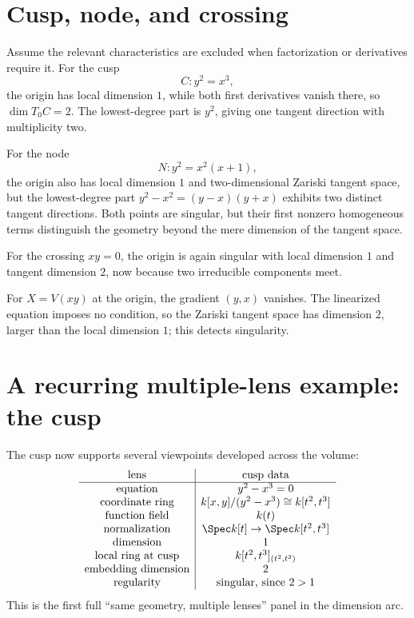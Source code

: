 \section{Cusp, node, and crossing}\label{sec:vi32-cusp-node}
Assume the relevant characteristics are excluded when factorization or derivatives require it.
For the cusp
\[
 C: y^2=x^3,
\]
the origin has local dimension $1$, while both first derivatives vanish there, so $\dim T_0C=2$.  The lowest-degree
part is $y^2$, giving one tangent direction with multiplicity two.

For the node
\[
 N:y^2=x^2(x+1),
\]
the origin also has local dimension $1$ and two-dimensional Zariski tangent space, but the lowest-degree part
$y^2-x^2=(y-x)(y+x)$ exhibits two distinct tangent directions.  Both points are singular, but their first nonzero
homogeneous terms distinguish the geometry beyond the mere dimension of the tangent space.

For the crossing $xy=0$, the origin is again singular with local dimension $1$ and tangent dimension $2$, now because
two irreducible components meet.


\begin{example}\label{ex:vi32-expand-03}
For $X=V(xy)$ at the origin, the gradient $(y,x)$ vanishes.  The linearized equation imposes no condition, so the Zariski tangent space has dimension $2$, larger than the local dimension $1$; this detects singularity.
\end{example}
\section{A recurring multiple-lens example: the cusp}\label{sec:vi32-cusp-lenses}
The cusp now supports several viewpoints developed across the volume:
\[
\begin{array}{c|c}
\text{lens} & \text{cusp data}\\ \hline
\text{equation} & y^2-x^3=0\\
\text{coordinate ring} & k[x,y]/(y^2-x^3)\cong k[t^2,t^3]\\
\text{function field} & k(t)\\
\text{normalization} & \Spec k[t]\to\Spec k[t^2,t^3]\\
\text{dimension} & 1\\
\text{local ring at cusp} & k[t^2,t^3]_{(t^2,t^3)}\\
\text{embedding dimension} & 2\\
\text{regularity} & \text{singular, since }2>1
\end{array}
\]
This is the first full ``same geometry, multiple lenses'' panel in the dimension arc.

